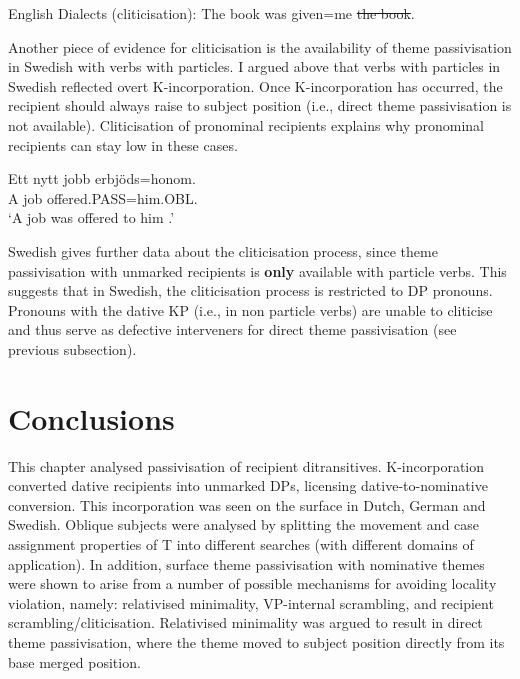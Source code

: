 \begin{exe}
	\ex English Dialects (cliticisation): The book was given=me \sout{the book}.
\end{exe}

Another piece of evidence for cliticisation is the availability of theme passivisation in Swedish with verbs with particles. I argued above that verbs with particles in Swedish reflected overt K-incorporation. Once K-incorporation has occurred, the recipient should always raise to subject position (i.e., direct theme passivisation is not available). Cliticisation of pronominal recipients explains why pronominal recipients can stay low in these cases.

\begin{exe}
	\ex \gll Ett nytt jobb erbjöds=honom.\\
A job offered.PASS=him.OBL.\\
\trans `A job was offered to him \citep{Anward.1989,Falk.1990,Lundquist.2006}.'
\end{exe}

Swedish gives further data about the cliticisation process, since theme passivisation with unmarked recipients is \textbf{only} available with particle verbs. This suggests that in Swedish, the cliticisation process is restricted to DP pronouns. Pronouns with the dative KP (i.e., in non particle verbs) are unable to cliticise and thus serve as defective interveners for direct theme passivisation (see previous subsection).

\begin{exe}
\end{exe}

\section{Conclusions}
This chapter analysed passivisation of recipient ditransitives. K-incorporation converted dative recipients into unmarked DPs, licensing dative-to-nominative conversion. This incorporation was seen on the surface in Dutch, German and Swedish. Oblique subjects were analysed by splitting the movement and case assignment properties of T into different searches (with different domains of application). In addition, surface theme passivisation with nominative themes were shown to arise from a number of possible mechanisms for avoiding locality violation, namely: relativised minimality, VP-internal scrambling, and recipient scrambling/cliticisation. Relativised minimality was argued to result in direct theme passivisation, where the theme moved to subject position directly from its base merged position.

%
